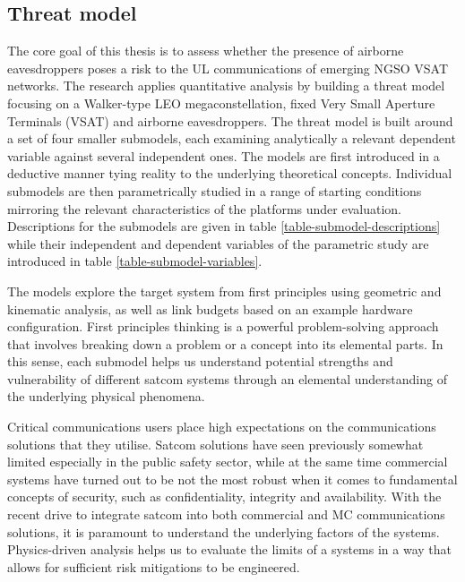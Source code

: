 \documentclass[english, 12pt, a4paper, elec, utf8, a-1b, online]{aaltothesis}
\begin{document}



\subsection{Threat model}

The core goal of this thesis is to assess whether the presence of airborne eavesdroppers poses a risk to the UL communications of emerging NGSO VSAT networks.
The research applies quantitative analysis by building a threat model focusing on a Walker-type LEO megaconstellation, fixed Very Small Aperture Terminals (VSAT) and airborne eavesdroppers.
The threat model is built around a set of four smaller submodels, each examining analytically a relevant dependent variable against several independent ones.
The models are first introduced in a deductive manner tying reality to the underlying theoretical concepts.
Individual submodels are then parametrically studied in a range of starting conditions mirroring the relevant characteristics of the platforms under evaluation.
Descriptions for the submodels are given in table \ref{table-submodel-descriptions} while their independent and dependent variables of the parametric study are introduced in table \ref{table-submodel-variables}.

The models explore the target system from first principles using geometric and kinematic analysis, as well as link budgets based on an example hardware configuration.
First principles thinking is a powerful problem-solving approach that involves breaking down a problem or a concept into its elemental parts.
In this sense, each submodel helps us understand potential strengths and vulnerability of different satcom systems through an elemental understanding of the underlying physical phenomena. %

Critical communications users place high expectations on the communications solutions that they utilise.
Satcom solutions have seen previously somewhat limited especially in the public safety sector, while at the same time commercial systems have turned out to be not the most robust when it comes to fundamental concepts of security, such as confidentiality, integrity and availability.
With the recent drive to integrate satcom into both commercial and MC communications solutions, it is paramount to understand the underlying factors of the systems. %
Physics-driven analysis helps us to evaluate the limits of a systems in a way that allows for sufficient risk mitigations to be engineered. %
\end{document}
